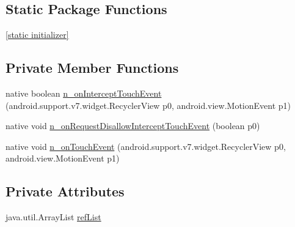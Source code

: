 \subsection*{Static Package Functions}
\begin{CompactItemize}
\item 
\hyperlink{classmono_1_1android_1_1support_1_1v7_1_1widget_1_1_recycler_view___on_item_touch_listener_implementor_076eb10399c910bb2c1d920c6d2f7fe6}{\mbox{[}static initializer\mbox{]}}
\end{CompactItemize}
\subsection*{Private Member Functions}
\begin{CompactItemize}
\item 
native boolean \hyperlink{classmono_1_1android_1_1support_1_1v7_1_1widget_1_1_recycler_view___on_item_touch_listener_implementor_76d501d008fe24435ebe84da2e365c2e}{n\_\-onInterceptTouchEvent} (android.support.v7.widget.RecyclerView p0, android.view.MotionEvent p1)
\item 
native void \hyperlink{classmono_1_1android_1_1support_1_1v7_1_1widget_1_1_recycler_view___on_item_touch_listener_implementor_51ed95cfa332b96eecdcc6df549e726c}{n\_\-onRequestDisallowInterceptTouchEvent} (boolean p0)
\item 
native void \hyperlink{classmono_1_1android_1_1support_1_1v7_1_1widget_1_1_recycler_view___on_item_touch_listener_implementor_42498de05bb200b4fec8f1ccc907fcf2}{n\_\-onTouchEvent} (android.support.v7.widget.RecyclerView p0, android.view.MotionEvent p1)
\end{CompactItemize}
\subsection*{Private Attributes}
\begin{CompactItemize}
\item 
java.util.ArrayList \hyperlink{classmono_1_1android_1_1support_1_1v7_1_1widget_1_1_recycler_view___on_item_touch_listener_implementor_a7b92ddf820b4454d028422af7961637}{refList}
\end{CompactItemize}


